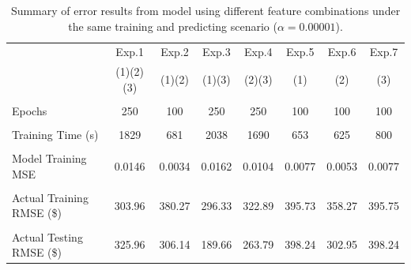 \begin{table}[H]
    \begin{center}
        \begin{tabular}{M{2.5cm} | c |c |c |c |c | c| c}
        \label{result_summary_all}
            
              & Exp.1 & Exp.2 & Exp.3 & Exp.4 & Exp.5 & Exp.6 & Exp.7 \\ & (1)(2)(3) & (1)(2) & (1)(3) & (2)(3) & (1) & (2) & (3)  \\ 
            \hline
             & & & & & & & \\
            Epochs & 250 & 100 & 250 & 250 & 100 & 100 & 100 \\ & & & & & & & \\
            
            Training Time (s) & 1829 & 681 & 2038 & 1690 & 653 & 625 & 800 \\ & & & & & & & \\


            Model Training MSE & 0.0146 & 0.0034 & 0.0162 & 0.0104 & 0.0077 & 0.0053 & 0.0077\\ & & & & & & & \\
            
            Actual Training RMSE (\$) & 303.96 & 380.27 &  296.33 & 322.89 & 395.73 & 358.27 & 395.75 \\ & & & & & & & \\
            Actual Testing RMSE (\$) & 325.96 & 306.14 & 189.66 & 263.79 & 398.24 & 302.95 & 398.24  \\

        \end{tabular}
        \caption{Summary of error results from model using different feature combinations under the same training and predicting scenario ($\alpha = 0.00001$).}
    \end{center}
\end{table}\vspace{5mm}



